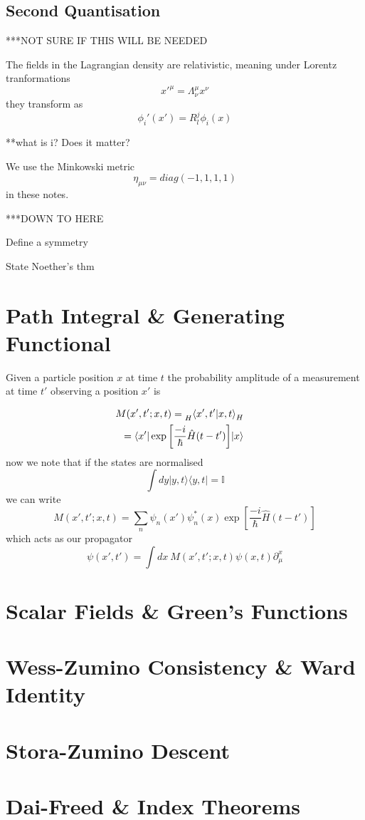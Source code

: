 \documentclass[11pt, a4paper]{article}
\theoremstyle{definition}
\theoremstyle{plain}
\begin{document}
\subsection{Second Quantisation}




***NOT SURE IF THIS WILL BE NEEDED

The fields in the Lagrangian density are relativistic, 
meaning under Lorentz tranformations
\[ x'^{\mu} = \Lambda^{\mu}_{\nu} x^{\nu} \]
they transform as 
\[ \phi_i'(x') = R_l^j \phi_i(x) \]

**what is i? Does it matter?

We use the Minkowski metric 
\[ \eta_{\mu \nu} = diag(-1,1,1,1) \]
in these notes.

***DOWN TO HERE 

Define a symmetry

State Noether's thm



\section{Path Integral \& Generating Functional}
Given a particle position $x$ at time $t$ the probability amplitude of
a measurement at time $t'$ observing a position $x'$ is

\begin{align*}
  \begin{split}
  M(x', t'; x, t) &= \prescript{}{H}{\braket{x',t'|x, t}_{H}}
  \end{split} \\
  \begin{split}
  &= \braket{x'|\exp{\left[\frac{-i}{\hbar}\hat{H}(t-t')\right]}|x}
  \end{split}
\end{align*}\label{eq:1}
now we note that if the states are normalised
\begin{equation}
  \int{dy |y,t\rangle{} \langle{y,t|} } = \mathbb{I}
\end{equation}
we can write 
  \begin{equation}
    M(x', t'; x, t) = \sum_{n}{\psi_{n}(x')\psi_{n}^*(x)\exp{\left[\frac{-i}{\hbar}\hat{H}(t-t')\right]}}
  \end{equation}
which acts as our propagator
\begin{equation}
 \psi(x', t') = \int{dx \ M(x', t'; x, t) \psi(x, t)}
 \partial^{x}_{\mu}
\end{equation}


\section{Scalar Fields \& Green's Functions}
\section{Wess-Zumino Consistency \& Ward Identity}
\section{Stora-Zumino Descent}
\section{Dai-Freed \& Index Theorems}

\newpage


\end{document}
